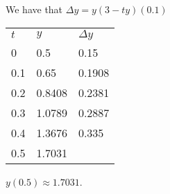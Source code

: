 \documentclass{article}
\begin{document}
\sol We have that $\Delta y = y(3-ty) (0.1)$
\begin{center}
  \begin{tabular}{l|l|l}
    $t$ & $y$    & $\Delta y$ \\
    0   & 0.5    & 0.15       \\
    0.1 & 0.65   & 0.1908     \\
    0.2 & 0.8408 & 0.2381     \\
    0.3 & 1.0789 & 0.2887     \\
    0.4 & 1.3676 & 0.335      \\
    0.5 & 1.7031 & 
  \end{tabular}
  \end{center}
$\boxed{y(0.5) \approx 1.7031}$.
\end{document}
